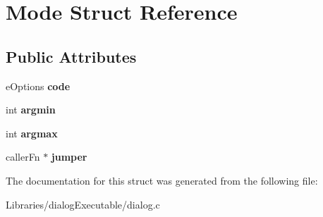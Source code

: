 \hypertarget{struct_mode}{}\section{Mode Struct Reference}
\label{struct_mode}
\subsection*{Public Attributes}
\begin{DoxyCompactItemize}
\item 
e\+Options {\bfseries code}\hypertarget{struct_mode_ac16b769e469d6436330477b9f87f3a6b}{}\label{struct_mode_ac16b769e469d6436330477b9f87f3a6b}

\item 
int {\bfseries argmin}\hypertarget{struct_mode_a57504f3b4e0eb7fdb760596fce71ffcc}{}\label{struct_mode_a57504f3b4e0eb7fdb760596fce71ffcc}

\item 
int {\bfseries argmax}\hypertarget{struct_mode_a8b4c1e57c9f7e2e0d93d15564b4f841c}{}\label{struct_mode_a8b4c1e57c9f7e2e0d93d15564b4f841c}

\item 
caller\+Fn $\ast$ {\bfseries jumper}\hypertarget{struct_mode_a13e5f64390f1c24c055828c49c814ac3}{}\label{struct_mode_a13e5f64390f1c24c055828c49c814ac3}

\end{DoxyCompactItemize}


The documentation for this struct was generated from the following file\+:\begin{DoxyCompactItemize}
\item 
Libraries/dialog\+Executable/dialog.\+c\end{DoxyCompactItemize}

